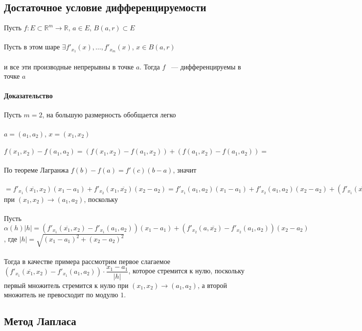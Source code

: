 \documentclass[../main.tex]{subfiles}
\begin{document}
\subsection{Достаточное условие дифференцируемости}
Пусть $f : E \subset \mathbb{R}^m \rightarrow \mathbb{R}$, $a \in E$, $B(a, r) \subset E$\\\\
Пусть в этом шаре $\exists f'_{x_1} (x), \ldots, f'_{x_m} (x)$, $x \in B(a, r)$\\\\
и все эти производные непрерывны в точке $a$. Тогда $f$ ~--- дифференцируемы в точке $a$\\\\
\textbf{Доказательство}\\\\
Пусть $m = 2$, на большую размерность обобщается легко\\\\
$a = (a_1, a_2)$, $x = (x_1, x_2)$\\\\
$f(x_1, x_2) - f(a_1, a_2) = \left( f(x_1, x_2) - f(a_1, x_2) \right) + \left(f(a_1, x_2) - f(a_1, a_2) \right) =$\\\\ 
По теореме Лагранжа $f(b) - f(a) = f'(c) (b - a)$, значит\\\\
$= f'_{x_1} (\overline{x_1}, x_2)(x_1 - a_1) + f'_{x_2}(x_1, \overline{x_2})(x_2 - a_2) = f'_{x_1}(a_1, a_2)(x_1 - a_1) + f'_{x_2} (a_1, a_2)(x_2 - a_2) + (f'_{x_1}(\overline{x_1}, x_2) - f'_{x_1}(a_1, a_2))(x_1 - a_1) + (f'_{x_2}(a, \overline{x_2}) - f'_{x_2}(a_1, a_2))(x_2 - a_2) \rightarrow 0$ при $(x_1, x_2) \rightarrow (a_1, a_2)$, поскольку\\\\
Пусть $\alpha(h) |h| = (f'_{x_1}(\overline{x_1}, x_2) - f'_{x_1}(a_1, a_2))(x_1 - a_1) + (f'_{x_2}(a, \overline{x_2}) - f'_{x_2}(a_1, a_2))(x_2 - a_2)$, где $|h| = \sqrt{(x_1 - a_1)^2 + (x_2 - a_2)^2}$\\\\
Тогда в качестве примера рассмотрим первое слагаемое $(f'_{x_1}(\overline{x_1}, x_2) - f'_{x_1}(a_1, a_2)) \cdot \dfrac{x_1 - a_1}{|h|}$, которое стремится к нулю, поскольку первый множитель стремится к нулю при $(x_1, x_2) \rightarrow (a_1, a_2)$, а второй множитель не превосходит по модулю $1$.


\newpage
\subsection{Метод Лапласа}
\newpage
\end{document}

